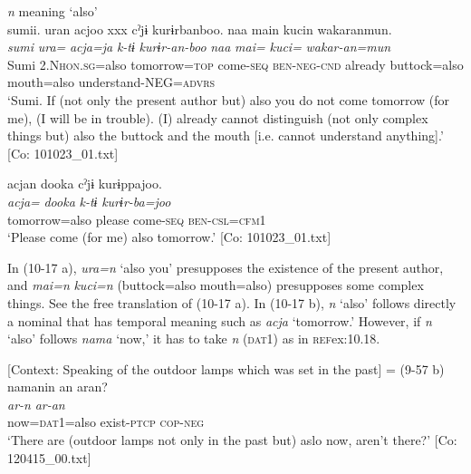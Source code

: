 \ea\label{ex:10.17}   \textit{n} meaning ‘also’\\
  \ea  %
      \glll    sumii.  uran  acjoo  xxx  cˀjɨ  kurɨrbanboo.  naa  main  kucin  wakaranmun.\\
      \textit{sumi}  \textit{ura=}  \textit{acja=ja}    \textit{k-tɨ}  \textit{kurɨr-an-boo}   \textit{naa}  \textit{mai=}  \textit{kuci=}  \textit{wakar-an=mun}\\
      Sumi  2.N\textsc{hon}.\textsc{sg}=also  tomorrow=\textsc{top}    come{}-\textsc{seq}  \textsc{ben}-\textsc{neg}-\textsc{cnd}    already  buttock=also  mouth=also  understand-NEG=\textsc{advrs}\\
      \glt       ‘Sumi. If (not only the present author but) also you do not come tomorrow (for me), (I will be in trouble). (I) already cannot distinguish (not only complex things but) also the buttock and the mouth [i.e. cannot understand anything].’ [Co: 101023\_01.txt]

  \ex  %
      \glll    acjan  dooka  cˀjɨ  kurɨppajoo.\\
      \textit{acja=}  \textit{dooka}  \textit{k-tɨ}  \textit{kurɨr-ba=joo}\\
      tomorrow=also  please  come-\textsc{seq}  \textsc{ben}-\textsc{csl}=\textsc{cfm}1\\
      \glt       ‘Please come (for me) also tomorrow.’ [Co: 101023\_01.txt]
    \z
\z

In (10-17 a), \textit{ura=n} ‘also you’ presupposes the existence of the present author, and \textit{mai=n} \textit{kuci=n} (buttock=also mouth=also) presupposes some complex things. See the free translation of (10-17 a). In (10-17 b), \textit{n} ‘also’ follows directly a nominal that has temporal meaning such as \textit{acja} ‘tomorrow.’ However, if \textit{n} ‘also’ follows \textit{nama} ‘now,’ it has to take \textit{n} (\textsc{dat}1) as in \textsc{ref}{ex:10.18}.

\ea\label{ex:10.18}   [Context: Speaking of the outdoor lamps which was set in the past] = (9-57 b)\\
      \glll    namanin  an  aran?\\
    \textit{}  \textit{ar-n}  \textit{ar-an}\\
    now=\textsc{dat}1=also  exist-\textsc{ptcp}  \textsc{cop}-\textsc{neg}\\
\glt     ‘There are (outdoor lamps not only in the past but) aslo now, aren’t there?’  [Co: 120415\_00.txt]
\z


